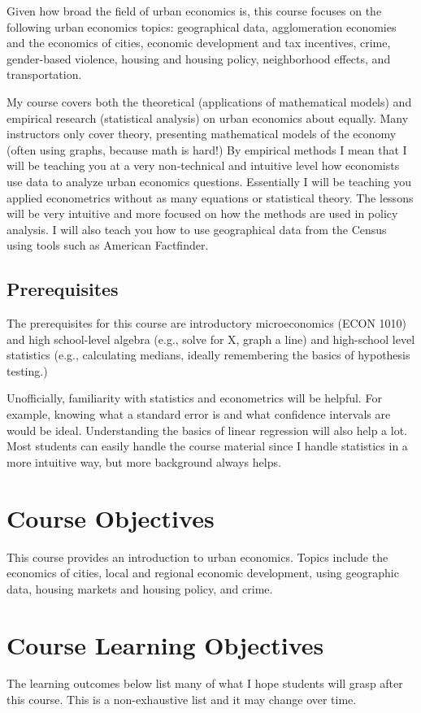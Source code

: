 \documentclass[11pt,letterpaper,final]{article}
\begin{document}
Given how broad the field of urban economics is, this course focuses on the following urban economics topics: geographical data, agglomeration economies and the economics of cities, economic development and tax incentives, crime, gender-based violence, housing and housing policy, neighborhood effects, and transportation. 

My course covers both the theoretical (applications of mathematical models) and empirical research (statistical analysis) on urban economics about equally. Many instructors only cover theory, presenting mathematical models of the economy (often using graphs, because math is hard!) By empirical methods I mean that I will be teaching you at a very non-technical and intuitive level how economists use data to analyze urban economics questions. Essentially I will be teaching you applied econometrics without as many equations or statistical theory. The lessons will be very intuitive and more focused on how the methods are used in policy analysis. I will also teach you how to use geographical data from the Census using tools such as American Factfinder.

\subsection{Prerequisites}
The prerequisites for this course are introductory microeconomics (ECON 1010) and high school-level algebra (e.g., solve for X, graph a line) and high-school level statistics (e.g., calculating medians, ideally remembering the basics of hypothesis testing.) 

Unofficially, familiarity with statistics and econometrics will be helpful. For example, knowing what a standard error is and what confidence intervals are would be ideal. Understanding the basics of linear regression will also help a lot. Most students can easily handle the course material since I handle statistics in a more intuitive way, but more background always helps.

\section{Course Objectives} 
This course provides an introduction to urban economics. Topics include the economics of cities, local and regional economic development, using geographic data, housing markets and housing policy, and crime.

\section{Course Learning Objectives} The learning outcomes below list many of what I hope students will grasp after this course. This is a non-exhaustive list and it may change over time. 
\end{document}
